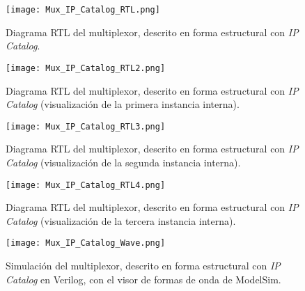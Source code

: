 \begin{figure}[ht]
	\centering
	\texttt{[image: Mux\_IP\_Catalog\_RTL.png]}
	\caption{Diagrama RTL del multiplexor, descrito en forma estructural con \textit{IP Catalog}. \label{fig:mux_ipcatalog_rtl}}
\end{figure}

\begin{figure}[ht]
	\centering
	\texttt{[image: Mux\_IP\_Catalog\_RTL2.png]}
	\caption{Diagrama RTL del multiplexor, descrito en forma estructural con \textit{IP Catalog} (visualización de la primera instancia interna). \label{fig:mux_ipcatalog_rtl2}}
\end{figure}

\begin{figure}[ht]
	\centering
	\texttt{[image: Mux\_IP\_Catalog\_RTL3.png]}
	\caption{Diagrama RTL del multiplexor, descrito en forma estructural con \textit{IP Catalog} (visualización de la segunda instancia interna). \label{fig:mux_ipcatalog_rtl3}}
\end{figure}

\begin{figure}[ht]
	\centering
	\texttt{[image: Mux\_IP\_Catalog\_RTL4.png]}
	\caption{Diagrama RTL del multiplexor, descrito en forma estructural con \textit{IP Catalog} (visualización de la tercera instancia interna). \label{fig:mux_ipcatalog_rtl4}}
\end{figure}

\begin{figure}[ht]
	\centering
	\texttt{[image: Mux\_IP\_Catalog\_Wave.png]}
	\caption{Simulación del multiplexor, descrito en forma estructural con \textit{IP Catalog} en Verilog, con el visor de formas de onda de ModelSim. \label{fig:mux_ipcatalog_wave}}
\end{figure}